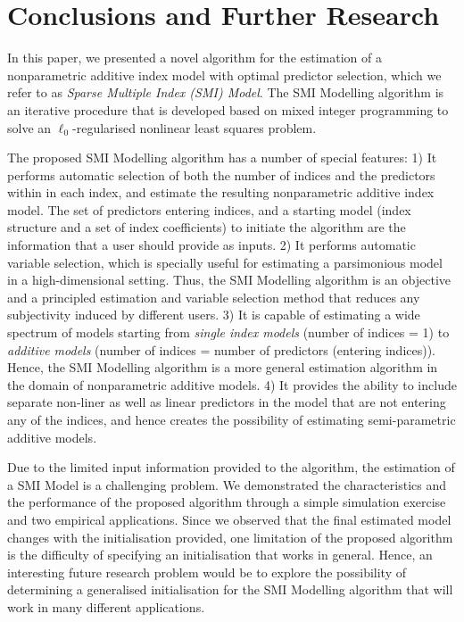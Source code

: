 \documentclass[11pt,a4paper,]{article}
\begin{document}
\hypertarget{sec-conclusion}{%
\section{Conclusions and Further Research}\label{sec-conclusion}}

In this paper, we presented a novel algorithm for the estimation of a
nonparametric additive index model with optimal predictor selection,
which we refer to as \emph{Sparse Multiple Index (SMI) Model}. The SMI
Modelling algorithm is an iterative procedure that is developed based on
mixed integer programming to solve an \(\ell_{0}\)-regularised nonlinear
least squares problem.

The proposed SMI Modelling algorithm has a number of special features:
1) It performs automatic selection of both the number of indices and the
predictors within in each index, and estimate the resulting
nonparametric additive index model. The set of predictors entering
indices, and a starting model (index structure and a set of index
coefficients) to initiate the algorithm are the information that a user
should provide as inputs. 2) It performs automatic variable selection,
which is specially useful for estimating a parsimonious model in a
high-dimensional setting. Thus, the SMI Modelling algorithm is an
objective and a principled estimation and variable selection method that
reduces any subjectivity induced by different users. 3) It is capable of
estimating a wide spectrum of models starting from \emph{single index
models} (number of indices = 1) to \emph{additive models} (number of
indices = number of predictors (entering indices)). Hence, the SMI
Modelling algorithm is a more general estimation algorithm in the domain
of nonparametric additive models. 4) It provides the ability to include
separate non-liner as well as linear predictors in the model that are
not entering any of the indices, and hence creates the possibility of
estimating semi-parametric additive models.

Due to the limited input information provided to the algorithm, the
estimation of a SMI Model is a challenging problem. We demonstrated the
characteristics and the performance of the proposed algorithm through a
simple simulation exercise and two empirical applications. Since we
observed that the final estimated model changes with the initialisation
provided, one limitation of the proposed algorithm is the difficulty of
specifying an initialisation that works in general. Hence, an
interesting future research problem would be to explore the possibility
of determining a generalised initialisation for the SMI Modelling
algorithm that will work in many different applications.
\end{document}
